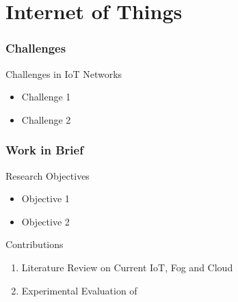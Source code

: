 \documentclass[aspectratio=169,mathserif]{beamer}
\begin{document}
\section{Internet of Things} 
\begin{frame}
\frametitle{Challenges}
\begin{block}{Challenges in  IoT Networks}
\begin{itemize}
    \item Challenge 1
    \pause
    \item Challenge 2
    \pause
\end{itemize}
\end{block}
\transboxin
\end{frame}
\begin{frame}
\frametitle{Work in Brief}
\begin{block}{Research Objectives}
\begin{itemize}
    \item Objective 1
    \item Objective 2
\end{itemize}
\end{block}
\transboxin
\begin{alertblock}{Contributions}
\begin{enumerate}
    \item Literature Review on Current IoT, Fog and Cloud 
    \item Experimental Evaluation of 
\end{enumerate}
\end{alertblock}
\end{frame}
\end{document}
